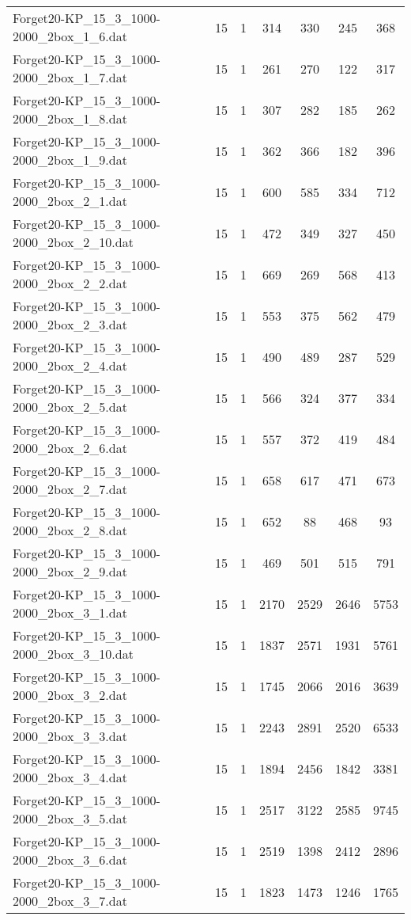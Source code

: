 \begin{table}[!ht]
\begin{tabular}{lcccccc}
Forget20-KP\_15\_3\_1000-2000\_2box\_1\_6.dat & 15 & 1 & 314 & 330 & 245 & 368 \\
Forget20-KP\_15\_3\_1000-2000\_2box\_1\_7.dat & 15 & 1 & 261 & 270 & 122 & 317 \\
Forget20-KP\_15\_3\_1000-2000\_2box\_1\_8.dat & 15 & 1 & 307 & 282 & 185 & 262 \\
Forget20-KP\_15\_3\_1000-2000\_2box\_1\_9.dat & 15 & 1 & 362 & 366 & 182 & 396 \\
Forget20-KP\_15\_3\_1000-2000\_2box\_2\_1.dat & 15 & 1 & 600 & 585 & 334 & 712 \\
Forget20-KP\_15\_3\_1000-2000\_2box\_2\_10.dat & 15 & 1 & 472 & 349 & 327 & 450 \\
Forget20-KP\_15\_3\_1000-2000\_2box\_2\_2.dat & 15 & 1 & 669 & 269 & 568 & 413 \\
Forget20-KP\_15\_3\_1000-2000\_2box\_2\_3.dat & 15 & 1 & 553 & 375 & 562 & 479 \\
Forget20-KP\_15\_3\_1000-2000\_2box\_2\_4.dat & 15 & 1 & 490 & 489 & 287 & 529 \\
Forget20-KP\_15\_3\_1000-2000\_2box\_2\_5.dat & 15 & 1 & 566 & 324 & 377 & 334 \\
Forget20-KP\_15\_3\_1000-2000\_2box\_2\_6.dat & 15 & 1 & 557 & 372 & 419 & 484 \\
Forget20-KP\_15\_3\_1000-2000\_2box\_2\_7.dat & 15 & 1 & 658 & 617 & 471 & 673 \\
Forget20-KP\_15\_3\_1000-2000\_2box\_2\_8.dat & 15 & 1 & 652 & 88 & 468 & 93 \\
Forget20-KP\_15\_3\_1000-2000\_2box\_2\_9.dat & 15 & 1 & 469 & 501 & 515 & 791 \\
Forget20-KP\_15\_3\_1000-2000\_2box\_3\_1.dat & 15 & 1 & 2170 & 2529 & 2646 & 5753 \\
Forget20-KP\_15\_3\_1000-2000\_2box\_3\_10.dat & 15 & 1 & 1837 & 2571 & 1931 & 5761 \\
Forget20-KP\_15\_3\_1000-2000\_2box\_3\_2.dat & 15 & 1 & 1745 & 2066 & 2016 & 3639 \\
Forget20-KP\_15\_3\_1000-2000\_2box\_3\_3.dat & 15 & 1 & 2243 & 2891 & 2520 & 6533 \\
Forget20-KP\_15\_3\_1000-2000\_2box\_3\_4.dat & 15 & 1 & 1894 & 2456 & 1842 & 3381 \\
Forget20-KP\_15\_3\_1000-2000\_2box\_3\_5.dat & 15 & 1 & 2517 & 3122 & 2585 & 9745 \\
Forget20-KP\_15\_3\_1000-2000\_2box\_3\_6.dat & 15 & 1 & 2519 & 1398 & 2412 & 2896 \\
Forget20-KP\_15\_3\_1000-2000\_2box\_3\_7.dat & 15 & 1 & 1823 & 1473 & 1246 & 1765 \\

\end{tabular}
\end{table}
